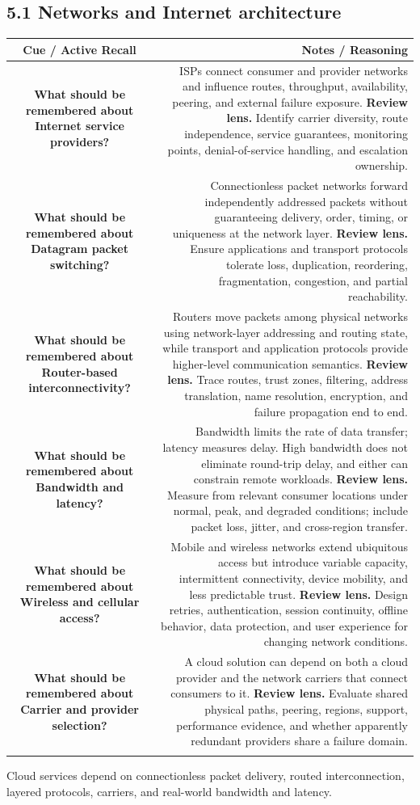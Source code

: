 \documentclass[11pt]{article}
\newcommand{\CornellHeader}{\rowcolor{Navy}\color{white}\bfseries Cue / Active Recall & \color{white}\bfseries Notes / Reasoning \\\endhead}
\newcommand{\CornellRow}[2]{\cellcolor{CueGray}\textbf{#1} & #2 \\\addlinespace[3pt]}
\begin{document}
\subsection{5.1 Networks and Internet architecture}
\begin{longtable}{@{}C N@{}}
\CornellHeader
\CornellRow{What should be remembered about Internet service providers?}{ISPs connect consumer and provider networks and influence routes, throughput, availability, peering, and external failure exposure. \textbf{Review lens.} Identify carrier diversity, route independence, service guarantees, monitoring points, denial-of-service handling, and escalation ownership.}
\CornellRow{What should be remembered about Datagram packet switching?}{Connectionless packet networks forward independently addressed packets without guaranteeing delivery, order, timing, or uniqueness at the network layer. \textbf{Review lens.} Ensure applications and transport protocols tolerate loss, duplication, reordering, fragmentation, congestion, and partial reachability.}
\CornellRow{What should be remembered about Router-based interconnectivity?}{Routers move packets among physical networks using network-layer addressing and routing state, while transport and application protocols provide higher-level communication semantics. \textbf{Review lens.} Trace routes, trust zones, filtering, address translation, name resolution, encryption, and failure propagation end to end.}
\CornellRow{What should be remembered about Bandwidth and latency?}{Bandwidth limits the rate of data transfer; latency measures delay. High bandwidth does not eliminate round-trip delay, and either can constrain remote workloads. \textbf{Review lens.} Measure from relevant consumer locations under normal, peak, and degraded conditions; include packet loss, jitter, and cross-region transfer.}
\CornellRow{What should be remembered about Wireless and cellular access?}{Mobile and wireless networks extend ubiquitous access but introduce variable capacity, intermittent connectivity, device mobility, and less predictable trust. \textbf{Review lens.} Design retries, authentication, session continuity, offline behavior, data protection, and user experience for changing network conditions.}
\CornellRow{What should be remembered about Carrier and provider selection?}{A cloud solution can depend on both a cloud provider and the network carriers that connect consumers to it. \textbf{Review lens.} Evaluate shared physical paths, peering, regions, support, performance evidence, and whether apparently redundant providers share a failure domain.}
\end{longtable}
\begin{sectionsummarybox}
Cloud services depend on connectionless packet delivery, routed interconnection, layered protocols, carriers, and real-world bandwidth and latency.
\end{sectionsummarybox}
\end{document}
